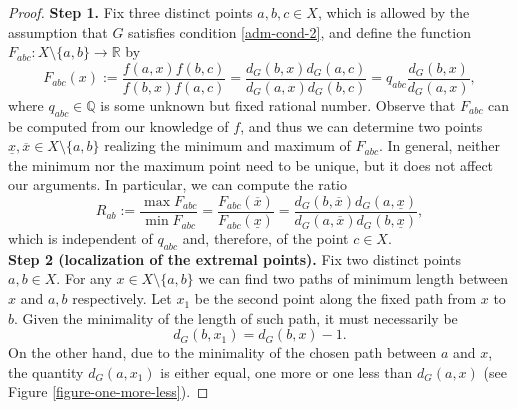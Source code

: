 \documentclass[a4paper,11pt,oneside]{amsart}
\newcommand{\R}{{\mathbb R}}
\newcommand{\Q}{{\mathbb Q}}
\begin{document}
\begin{proof}
\textbf{Step 1.} Fix three distinct points $a,b,c \in X$, which is allowed by the assumption that $G$ satisfies condition \ref{adm-cond-2}, and define the function $F_{abc}:X\setminus \{a,b\}\rightarrow \R$ by
$$ F_{abc}(x) := \frac{f(a,x)f(b,c)}{f(b,x)f(a,c)} = \frac{d_G(b,x)d_G(a,c)}{d_G(a,x)d_G(b,c)} = q_{abc} \frac{d_G(b,x)}{d_G(a,x)}, $$
where $q_{abc}\in \Q$ is some unknown but fixed rational number. Observe that $F_{abc}$ can be computed from our knowledge of $f$, and thus we can determine two points $\underline x, \overline x\in X\setminus\{a,b\}$ realizing the minimum and maximum of $F_{abc}$. In general, neither the minimum nor the maximum point need to be unique, but it does not affect our arguments. In particular, we can compute the ratio 
$$ R_{ab}:=\frac{\max F_{abc}}{\min F_{abc}}=\frac{F_{abc}(\overline x)}{F_{abc}(\underline x)} = \frac{d_G(b,\overline x)d_G(a,\underline x)}{d_G(a,\overline x)d_G(b,\underline x)}, $$
which is independent of $q_{abc}$ and, therefore, of the point $c\in X$. 
\\

\textbf{Step 2 (localization of the extremal points).} Fix two distinct points $a,b\in X$. For any $x\in X\setminus\{a,b\}$ we can find two paths of minimum length between $x$ and $a,b$ respectively. 
Let $x_1$ be the second point along the fixed path from $x$ to $b$. Given the minimality of the length of such path, it must necessarily be $$d_G(b,x_1)=d_G(b,x)-1.$$ On the other hand, due to the minimality of the chosen path between $a$ and $x$, the quantity $d_G(a,x_1)$ is either equal, one more or one less than $d_G(a,x)$ (see Figure \ref{figure-one-more-less}).


\end{proof}
\end{document}

